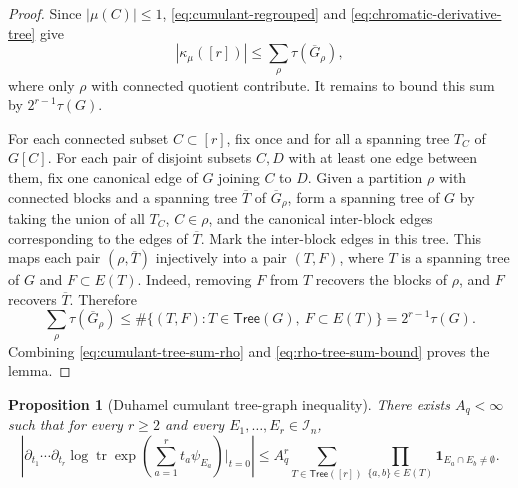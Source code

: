 \documentclass[11pt]{article}
\newtheorem{proposition}[theorem]{Proposition}
\newcommand{\tr}{\operatorname{tr}}
\newcommand{\calI}{\mathcal{I}}
\newcommand{\ind}{\mathbf{1}}
\begin{document}
\begin{proof}
  Since $|\mu(C)|\leq1$, \eqref{eq:cumulant-regrouped} and
  \eqref{eq:chromatic-derivative-tree} give
  \begin{equation}\label{eq:cumulant-tree-sum-rho}
    |\kappa_\mu([r])|
    \leq
    \sum_{\rho}\tau(\overline G_\rho),
  \end{equation}
  where only $\rho$ with connected quotient contribute.
  It remains to bound this sum by $2^{r-1}\tau(G)$.

  For each connected subset $C\subset[r]$, fix once and for all a spanning tree
  $T_C$ of $G[C]$.  For each pair of disjoint subsets $C,D$ with at least one
  edge between them, fix one canonical edge of $G$ joining $C$ to $D$.
  Given a partition $\rho$ with connected blocks and a spanning tree
  $\overline T$ of $\overline G_\rho$, form a spanning tree of $G$ by taking the
  union of all $T_C$, $C\in\rho$, and the canonical inter-block edges
  corresponding to the edges of $\overline T$.  Mark the inter-block edges in
  this tree.  This maps each pair $(\rho,\overline T)$ injectively into a pair
  $(T,F)$, where $T$ is a spanning tree of $G$ and $F\subset E(T)$.  Indeed,
  removing $F$ from $T$ recovers the blocks of $\rho$, and $F$ recovers
  $\overline T$.  Therefore
  \begin{equation}\label{eq:rho-tree-sum-bound}
    \sum_\rho \tau(\overline G_\rho)
    \leq
    \#\{(T,F):T\in\mathsf{Tree}(G),\ F\subset E(T)\}
    =
    2^{r-1}\tau(G).
  \end{equation}
  Combining \eqref{eq:cumulant-tree-sum-rho} and
  \eqref{eq:rho-tree-sum-bound} proves the lemma.
\end{proof}

\begin{proposition}[Duhamel cumulant tree-graph inequality]
  \label{prop:duhamel-tree-graph}
  There exists $A_q<\infty$ such that for every $r\geq2$ and every
  $E_1,\ldots,E_r\in\calI_n$,
  \begin{equation}\label{eq:duhamel-tree-graph}
    \left|
      \partial_{t_1}\cdots\partial_{t_r}
      \log\tr\exp\left(\sum_{a=1}^r t_a\psi_{E_a}\right)\bigg|_{t=0}
    \right|
    \leq
    A_q^r
    \sum_{T\in\mathsf{Tree}([r])}
    \prod_{\{a,b\}\in E(T)}
    \ind_{E_a\cap E_b\neq\emptyset}.
  \end{equation}
\end{proposition}
\end{document}
